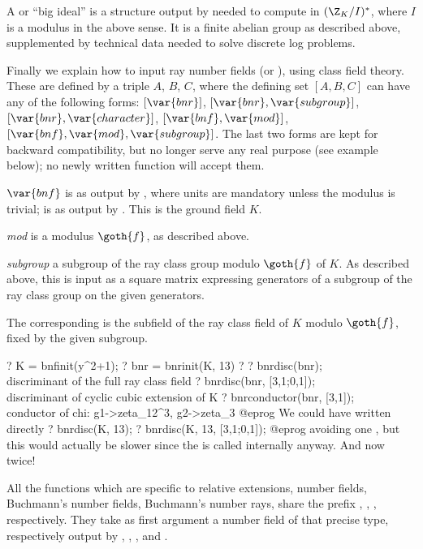 A  or ``big ideal'' is a structure output by 
needed to compute in $(\Z_K/I)^*$, where $I$ is a modulus in the above sense.
It is a finite abelian group as described above, supplemented by
technical data needed to solve discrete log problems.

Finally we explain how to input ray number fields (or ), using class
field theory. These are defined by a triple $A$, $B$, $C$, where the
defining set $[A,B,C]$ can have any of the following forms:
$[\var{bnr}]$,
$[\var{bnr},\var{subgroup}]$,
$[\var{bnr},\var{character}]$,
$[\var{bnf},\var{mod}]$,
$[\var{bnf},\var{mod},\var{subgroup}]$. The last two forms are kept for
backward compatibility, but no longer serve any real purpose (see example
below); no newly written function will accept them.

\item $\var{bnf}$ is as output by , where units are mandatory
unless the modulus is trivial;  is as output by . This
is the ground field $K$.

\item \emph{mod} is a modulus $\goth{f}$, as described above.

\item \emph{subgroup} a subgroup of the ray class group modulo $\goth{f}$ of
$K$. As described above, this is input as a square matrix expressing
generators of a subgroup of the ray class group  on the
given generators.

The corresponding  is the subfield of the ray class field of $K$
modulo $\goth{f}$, fixed by the given subgroup.

\bprog
  ? K = bnfinit(y^2+1);
  ? bnr = bnrinit(K, 13)
  ? %
  ? bnrdisc(bnr); \\ discriminant of the full ray class field
  ? bnrdisc(bnr, [3,1;0,1]); \\ discriminant of cyclic cubic extension of K
  ? bnrconductor(bnr, [3,1]); \\ conductor of chi: g1->zeta_12^3, g2->zeta_3
@eprog\noindent
We could have written directly
\bprog
  ? bnrdisc(K, 13);
  ? bnrdisc(K, 13, [3,1;0,1]);
@eprog\noindent
avoiding one , but this would actually be slower since the
 is called internally anyway. And now twice!


All the functions which are specific to relative extensions, number fields,
Buchmann's number fields, Buchmann's number rays, share the prefix ,
, ,  respectively. They take as first argument a
number field of that precise type, respectively output by ,
, , and .

